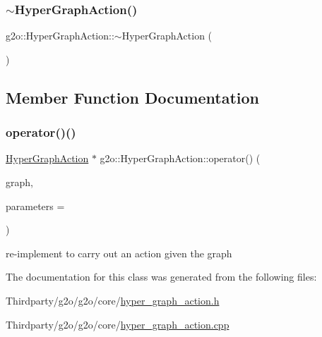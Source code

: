 \subsubsection{\texorpdfstring{$\sim$\+Hyper\+Graph\+Action()}{~HyperGraphAction()}}
{\footnotesize\ttfamily g2o\+::\+Hyper\+Graph\+Action\+::$\sim$\+Hyper\+Graph\+Action (\begin{DoxyParamCaption}{ }\end{DoxyParamCaption})\hspace{0.3cm}{\ttfamily [virtual]}}



\subsection{Member Function Documentation}
\mbox{\label{classg2o_1_1_hyper_graph_action_aea392eafa65ab432a3c4d1dabde9bdbe}} 
\subsubsection{\texorpdfstring{operator()()}{operator()()}}
{\footnotesize\ttfamily \mbox{\hyperlink{classg2o_1_1_hyper_graph_action}{Hyper\+Graph\+Action}} $\ast$ g2o\+::\+Hyper\+Graph\+Action\+::operator() (\begin{DoxyParamCaption}\item[{const \mbox{\hyperlink{classg2o_1_1_hyper_graph}{Hyper\+Graph}} $\ast$}]{graph,  }\item[{\mbox{\hyperlink{classg2o_1_1_hyper_graph_action_1_1_parameters}{Parameters}} $\ast$}]{parameters = {} }\end{DoxyParamCaption})\hspace{0.3cm}{\ttfamily [virtual]}}

re-\/implement to carry out an action given the graph 

The documentation for this class was generated from the following files\+:\begin{DoxyCompactItemize}
\item 
Thirdparty/g2o/g2o/core/\mbox{\hyperlink{hyper__graph__action_8h}{hyper\+\_\+graph\+\_\+action.\+h}}\item 
Thirdparty/g2o/g2o/core/\mbox{\hyperlink{hyper__graph__action_8cpp}{hyper\+\_\+graph\+\_\+action.\+cpp}}\end{DoxyCompactItemize}

